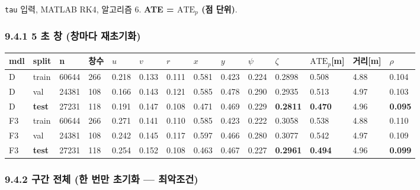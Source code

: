 \documentclass[10pt,a4paper]{article}
\begin{document}
\texttt{tau} 입력, MATLAB RK4, 알고리즘 6. \textbf{ATE = $\mathrm{ATE}_p$ (점 단위)}.

\subsubsection*{9.4.1 5 초 창 (창마다 재초기화)}

\begin{center}\scriptsize\setlength{\tabcolsep}{3pt}
\begin{tabular}{@{}llllllllllllll@{}}
\toprule
\textbf{mdl} & \textbf{split} & \textbf{n} & \textbf{창수} & \textbf{$u$} & \textbf{$v$} & \textbf{$r$} & \textbf{$x$} & \textbf{$y$} & \textbf{$\psi$} & \textbf{$\zeta$} & \textbf{$\mathrm{ATE}_p$[m]} & \textbf{거리[m]} & \textbf{$\rho$} \\
\midrule
D & train & 60644 & 266 & 0.218 & 0.133 & 0.111 & 0.581 & 0.423 & 0.224 & 0.2898 & 0.508 & 4.88 & 0.104 \\
D & val & 24381 & 108 & 0.166 & 0.143 & 0.121 & 0.585 & 0.478 & 0.290 & 0.2935 & 0.513 & 4.97 & 0.103 \\
D & \textbf{test} & 27231 & 118 & 0.191 & 0.147 & 0.108 & 0.471 & 0.469 & 0.229 & \textbf{0.2811} & \textbf{0.470} & 4.96 & \textbf{0.095} \\
F3 & train & 60644 & 266 & 0.271 & 0.141 & 0.110 & 0.585 & 0.423 & 0.222 & 0.3058 & 0.538 & 4.88 & 0.110 \\
F3 & val & 24381 & 108 & 0.242 & 0.145 & 0.117 & 0.597 & 0.466 & 0.280 & 0.3077 & 0.542 & 4.97 & 0.109 \\
F3 & \textbf{test} & 27231 & 118 & 0.254 & 0.152 & 0.108 & 0.463 & 0.467 & 0.227 & \textbf{0.2961} & \textbf{0.494} & 4.96 & \textbf{0.099} \\
\bottomrule
\end{tabular}
\end{center}

\subsubsection*{9.4.2 구간 전체 (한 번만 초기화 --- 최악조건)}
\end{document}
